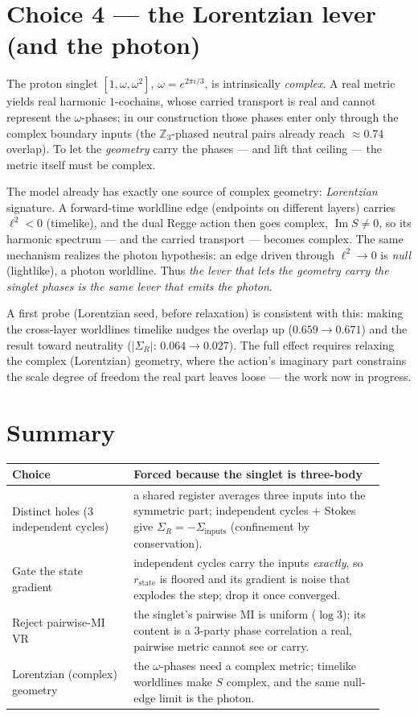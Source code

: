 \documentclass[11pt]{article}
\theoremstyle{definition}
\newcommand{\Z}{\mathbb{Z}}
\newcommand{\Sg}{\Sigma}
\newcommand{\lsq}{\ell^2}
\begin{document}
\section{Choice 4 --- the Lorentzian lever (and the photon)}

The proton singlet $[1,\omega,\omega^2]$, $\omega=e^{2\pi i/3}$, is intrinsically
\emph{complex}. A real metric yields real harmonic $1$-cochains, whose carried
transport is real and cannot represent the $\omega$-phases; in our construction
those phases enter only through the complex boundary inputs (the $\Z_3$-phased
neutral pairs already reach $\approx 0.74$ overlap). To let the \emph{geometry}
carry the phases --- and lift that ceiling --- the metric itself must be complex.

The model already has exactly one source of complex geometry: \emph{Lorentzian}
signature. A forward-time worldline edge (endpoints on different layers) carries
$\lsq<0$ (timelike), and the dual Regge action then goes complex,
$\operatorname{Im}S\ne 0$, so its harmonic spectrum --- and the carried transport
--- becomes complex. The same mechanism realizes the photon hypothesis: an edge
driven through $\lsq\to 0$ is \emph{null} (lightlike), a photon worldline. Thus
\emph{the lever that lets the geometry carry the singlet phases is the same lever
that emits the photon}.

A first probe (Lorentzian seed, before relaxation) is consistent with this:
making the cross-layer worldlines timelike nudges the overlap up
($0.659\to 0.671$) and the result toward neutrality ($|\Sg_R|:\,0.064\to 0.027$).
The full effect requires relaxing the complex (Lorentzian) geometry, where the
action's imaginary part constrains the scale degree of freedom the real part
leaves loose --- the work now in progress.

\section{Summary}

\begin{center}
\begin{tabular}{@{}p{0.30\linewidth}p{0.62\linewidth}@{}}
\hline
\textbf{Choice} & \textbf{Forced because the singlet is three-body}\\
\hline
Distinct holes (3 independent cycles) & a shared register averages three inputs into the symmetric part; independent cycles + Stokes give $\Sg_R=-\Sg_{\text{inputs}}$ (confinement by conservation).\\[2pt]
Gate the state gradient & independent cycles carry the inputs \emph{exactly}, so $r_{\text{state}}$ is floored and its gradient is noise that explodes the step; drop it once converged.\\[2pt]
Reject pairwise-MI VR & the singlet's pairwise MI is uniform ($\log 3$); its content is a 3-party phase correlation a real, pairwise metric cannot see or carry.\\[2pt]
Lorentzian (complex) geometry & the $\omega$-phases need a complex metric; timelike worldlines make $S$ complex, and the same null-edge limit is the photon.\\
\hline
\end{tabular}
\end{center}
\end{document}
